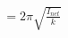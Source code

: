 \documentclass[preview]{standalone}
\begin{document}
\begin{align*}
= 2\pi \sqrt{\frac{I_{net}}{k}}
\end{align*}
\end{document}
